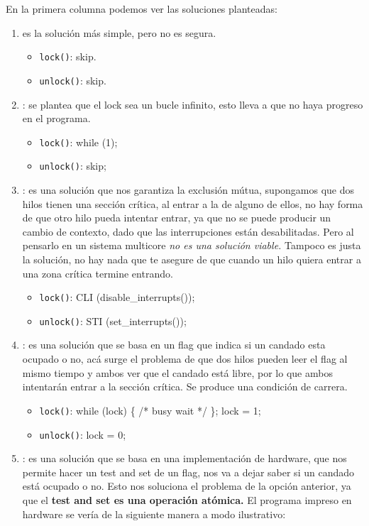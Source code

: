 \documentclass[openany]{book}
\begin{document}
En la primera columna podemos ver las soluciones planteadas:
\begin{enumerate}
    \item {} es la solución más simple, pero no es segura.
    \begin{itemize}
        \item \texttt{lock()}: skip.
        \item \texttt{unlock()}: skip.
    \end{itemize}
    \item {}: se plantea que el lock sea un bucle infinito, esto lleva a que no haya progreso en el programa.
    \begin{itemize}
        \item \texttt{lock()}: while (1); 
        \item \texttt{unlock()}: skip;
    \end{itemize}
    \item {}: es una solución que nos garantiza la exclusión mútua, supongamos que dos hilos tienen una sección crítica, al entrar a la de alguno de ellos, no hay forma de que otro hilo pueda intentar entrar, ya que no se puede producir un cambio de contexto, dado que las interrupciones están desabilitadas. Pero al pensarlo en un sistema multicore \textit{no es una solución viable.} Tampoco es justa la solución, no hay nada que te asegure de que cuando un hilo quiera entrar a una zona crítica termine entrando. 
    \begin{itemize}
        \item \texttt{lock()}: CLI (disable\_interrupts());
        \item \texttt{unlock()}: STI (set\_interrupts());
    \end{itemize}
    \item {}: es una solución que se basa en un flag que indica si un candado esta ocupado o no, acá surge el problema de que dos hilos pueden leer el flag al mismo tiempo y ambos ver que el candado está libre, por lo que ambos intentarán entrar a la sección crítica. Se produce una condición de carrera.
    \begin{itemize}
        \item \texttt{lock()}: while (lock) \{ /* busy wait */ \}; lock = 1;
        \item \texttt{unlock()}: lock = 0;
    \end{itemize}
    \item {}: es una solución que se basa en una implementación de hardware, que nos permite hacer un test and set de un flag, nos va a dejar saber si un candado está ocupado o no. Esto nos soluciona el problema de la opción anterior, ya que el \textbf{test and set es una operación atómica.} 
    El programa impreso en hardware se vería de la siguiente manera a modo ilustrativo:
    

\end{enumerate}
\end{document}
